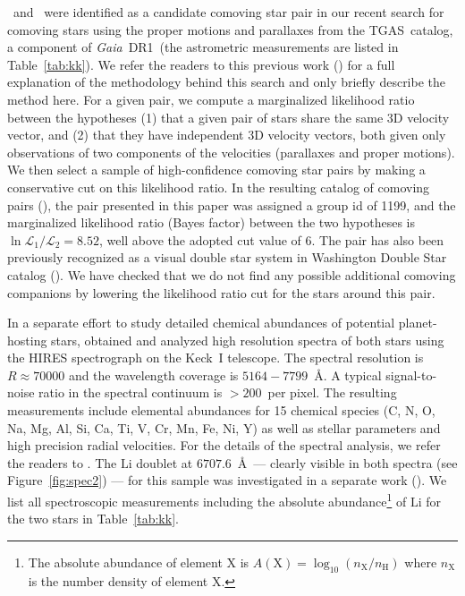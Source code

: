 \documentclass[modern, letterpaper]{aastex61}
\newcommand{\project}[1]{\textsl{#1}}
\newcommand{\acronym}[1]{{\small{#1}}}
\newcommand{\gaia}{\project{Gaia}}
\newcommand{\figname}{Figure}
\newcommand{\dr}{\acronym{DR1}}
\newcommand{\tgas}{\acronym{TGAS}}
\newcommand*\elem[1]{\ensuremath{\mathrm{#1}}}
\newcommand{\sunanalog}{\text{Krios}}
\newcommand{\bizarreone}{\text{Kronos}}
\renewcommand\tablename{Table}
\begin{document}
\sunanalog\ and \bizarreone\ were identified as a
candidate comoving star pair in our recent search for comoving stars using the
proper motions and parallaxes from the \tgas\ catalog, a component of \gaia\ \dr\
(the astrometric measurements are listed in \tablename~\ref{tab:kk}).
We refer the readers to this previous work (\citealt{2017AJ....153..257O}) for a
full explanation of the methodology behind this search and only briefly describe
the method here.
For a given pair, we compute a marginalized likelihood ratio between the
hypotheses (1) that a given pair of stars share the same 3D velocity vector, and
(2) that they have independent 3D velocity vectors, both given only observations
of two components of the velocities (parallaxes and proper motions).
We then select a sample of high-confidence comoving star pairs by making a
conservative cut on this likelihood ratio.
In the resulting catalog of comoving pairs (\citealt{2017AJ....153..257O}),
the pair presented in this paper was assigned a group id of 1199,
and the marginalized likelihood ratio (Bayes factor)
between the two hypotheses is $\ln{\mathcal{L}_1/\mathcal{L}_2} = 8.52$,
well above the adopted cut value of 6.
The pair has also been previously recognized as a visual double star system
in Washington Double Star catalog (\citealt{2001AJ....122.3466M}).
We have checked that we do not find any possible additional comoving companions
by lowering the likelihood ratio cut for the stars around this pair.

In a separate effort to study detailed chemical abundances of potential
planet-hosting stars, \citet{2016ApJS..225...32B} obtained and analyzed high resolution
spectra of both stars using the HIRES spectrograph on the Keck~I telescope.
The spectral resolution is $R\approx 70000$ and the wavelength coverage is
$5164-7799$~\AA.
A typical signal-to-noise ratio in the spectral continuum is $>200$~per pixel.
The resulting measurements include elemental abundances for 15 chemical species
(C, N, O, Na, Mg, Al, Si, Ca, Ti, V, Cr, Mn, Fe, Ni, Y) as well as stellar parameters
and high precision radial velocities.
For the details of the spectral analysis, we refer the readers to
\citealt{2016ApJS..225...32B}.
The \elem{Li} doublet at $6707.6$~\AA\ --- clearly visible in both spectra (see
\figname~\ref{fig:spec2}) --- for this sample was investigated in a separate
work (\citealt{jmlithium}).
We list all spectroscopic measurements including
the absolute abundance\footnote{
  The absolute abundance of element \elem{X} is
  $A(\elem{X}) = \log_{10} (n_\elem{X}/n_\elem{H})$
  where $n_\elem{X}$ is the number density of element \elem{X}.
}
of \elem{Li} for the two stars in Table~\ref{tab:kk}.
\end{document}
